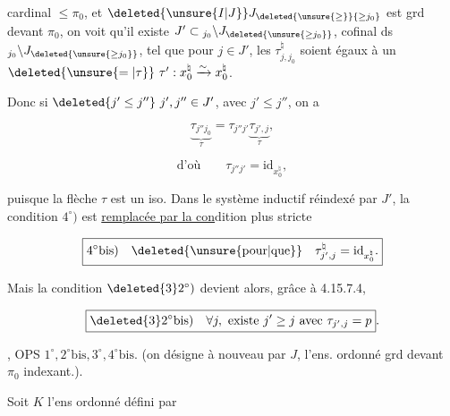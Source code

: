 %
%
cardinal $\leq\pi_0$, et $\deleted{\unsure{I|J}}J_{\deleted{\unsure{\geq}}{\geq j_0}}$ est grd devant $\pi_0$, on voit qu'il existe $J'\subset{}_{j_0}\backslash J_{\deleted{\unsure{\geq j_0}}}$, cofinal ds $\mathord{}_{j_0}\backslash J_{\deleted{\unsure{\geq j_0}}}$, tel que pour $j\in J'$, les $\tau_{j,j_0}^\natural$ soient égaux à un $\deleted{\unsure{=|\tau}}\ \tau':x_0^\natural\xrightarrow{\sim}x_0^\natural$.

Donc si $\deleted{j'\leq j''}\ j',j''\in J'$, avec $j'\leq j''$, on a

\[\underbrace{\tau_{j''j_0}}_{\tau}=\tau_{j''j'}\underbrace{\tau_{j',j}}_{\tau},\]

\[\text{d'où}\qquad\tau_{j''j'}=\mathrm{id}_{x_0^\natural},\]

puisque la flèche $\tau$  est un iso. Dans  le système inductif réindexé par $J'$,  la condition $4^\circ)$ est \uline{remplacée par la con}dition plus stricte

\[\boxed{4^\circ\text{bis})\quad\deleted{\text{\unsure{pour|que}}}\quad\tau_{j',j}^\natural=\mathrm{id}_{x_0^\natural}.}\]

Mais la condition $\deleted{3}2^\circ)$ devient alors, grâce à 4.15.7.4,

\[\boxed{\deleted{3}2^\circ\text{bis})\quad\forall j,\ \text{existe }j'\geq j\ \text{avec }\tau_{j',j}=p}. \]

, OPS $1^\circ,2^\circ\mathrm{bis},3^\circ,4^\circ\mathrm{bis}$. (on désigne à nouveau par $J$,  l'ens. ordonné grd devant $\pi_0$ indexant.).


Soit $K$ l'ens ordonné défini par
